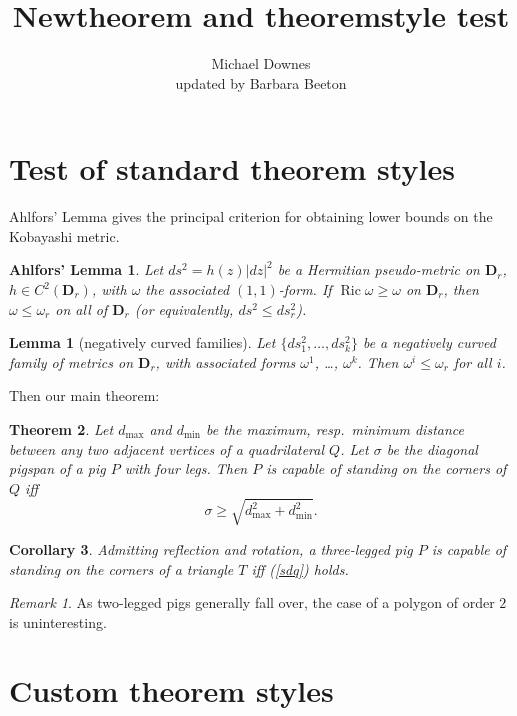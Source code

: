 \documentclass{article}
\title{Newtheorem and theoremstyle test}
\author{Michael Downes\\updated by Barbara Beeton}
\newtheorem{thm}{Theorem}[section]
\newtheorem{cor}[thm]{Corollary}
\newtheorem{lem}[thm]{Lemma}
\theoremstyle{remark}
\newtheorem*{rmk}{Remark}
\theoremstyle{plain}
\newtheorem*{Ahlfors}{Ahlfors' Lemma}
\theoremstyle{note}
\theoremstyle{citing}
\theoremstyle{break}
\theoremstyle{exercise}
\theoremstyle{plain}
\let\lvert=|\let\rvert=|
\newcommand{\Ric}{\mathop{\mathrm{Ric}}\nolimits}
\begin{document}
\maketitle

\section{Test of standard theorem styles}

Ahlfors' Lemma gives the principal criterion for obtaining lower bounds
on the Kobayashi metric.

\begin{Ahlfors}
Let $ds^2 = h(z)\lvert dz\rvert^2$ be a Hermitian pseudo-metric on
$\mathbf{D}_r$, $h\in C^2(\mathbf{D}_r)$, with $\omega$ the associated
$(1,1)$-form. If $\Ric\omega\geq\omega$ on $\mathbf{D}_r$,
then $\omega\leq\omega_r$ on all of $\mathbf{D}_r$ (or equivalently,
$ds^2\leq ds_r^2$).
\end{Ahlfors}

\begin{lem}[negatively curved families]
Let $\{ds_1^2,\dots,ds_k^2\}$ be a negatively curved family of metrics
on $\mathbf{D}_r$, with associated forms $\omega^1$, \dots, $\omega^k$.
Then $\omega^i \leq\omega_r$ for all $i$.
\end{lem}

Then our main theorem:
\begin{thm}\label{pigspan}
Let $d_{\max}$ and $d_{\min}$ be the maximum, resp.\ minimum distance
between any two adjacent vertices of a quadrilateral $Q$. Let $\sigma$
be the diagonal pigspan of a pig $P$ with four legs.
Then $P$ is capable of standing on the corners of $Q$ iff
\begin{equation}\label{sdq}
\sigma\geq \sqrt{d_{\max}^2+d_{\min}^2}.
\end{equation}
\end{thm}

\begin{cor}
Admitting reflection and rotation, a three-legged pig $P$ is capable of
standing on the corners of a triangle $T$ iff (\ref{sdq}) holds.
\end{cor}

\begin{rmk}
As two-legged pigs generally fall over, the case of a polygon of order
$2$ is uninteresting.
\end{rmk}

\section{Custom theorem styles}
\end{document}
